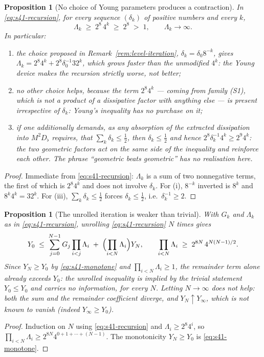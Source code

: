 \documentclass[11pt]{article}
\newtheorem{proposition}[theorem]{Proposition}
\theoremstyle{definition}
\theoremstyle{remark}
\begin{document}
\begin{proposition}[No choice of Young parameters produces a contraction]
  \label{prop:s41-nocontraction}
  In \eqref{eq:s41-recursion}, for every sequence $(\delta_k)$ of positive
  numbers and every $k$,
  \[
    \Lambda_k \;\geq\; 2^{8}\,4^{k} \;\geq\; 2^{8}\;>\;1,
    \qquad \Lambda_k\to\infty .
  \]
  In particular:
  \begin{enumerate}[label=(\roman*)]
    \item the choice proposed in Remark~\ref{rem:level-iteration},
      $\delta_k=\delta_0 8^{-k}$, gives
      $\Lambda_k=2^{8}4^{k}+2^{8}\delta_0^{-1}32^{k}$, which grows
      \emph{faster} than the unmodified $4^{k}$: the Young device makes the
      recursion strictly worse, not better;
    \item no other choice helps, because the term $2^{8}4^{k}$ --- coming
      from family (S1), which is not a product of a dissipative factor with
      anything else --- is present irrespective of $\delta_k$: Young's
      inequality has no purchase on it;
    \item if one additionally demands, as any absorption of the extracted
      dissipation into $M^2D_\flat$ requires, that $\sum_k\delta_k\leq\tfrac12$,
      then $\delta_k\leq\tfrac12$ and hence
      $2^{8}\delta_k^{-1}4^{k}\geq2^{9}4^{k}$: the two geometric factors act
      on the \emph{same} side of the inequality and reinforce each other.
      The phrase ``geometric beats geometric'' has no realisation here.
  \end{enumerate}
\end{proposition}
\begin{proof}
  Immediate from \eqref{eq:s41-recursion}: $\Lambda_k$ is a sum of two
  nonnegative terms, the first of which is $2^{8}4^{k}$ and does not involve
  $\delta_k$. For (i), $8^{-k}$ inverted is $8^{k}$ and
  $8^{k}4^{k}=32^{k}$. For (iii), $\sum_k\delta_k\leq\tfrac12$ forces
  $\delta_k\leq\tfrac12$, i.e.\ $\delta_k^{-1}\geq2$.
\end{proof}

\begin{proposition}[The unrolled iteration is weaker than trivial]
  \label{prop:s41-vacuous}
  With $G_k$ and $\Lambda_k$ as in \eqref{eq:s41-recursion}, unrolling
  \eqref{eq:s41-recursion} $N$ times gives
  \[
    Y_0 \;\leq\; \sum_{j=0}^{N-1}G_j\prod_{i<j}\Lambda_i
      \;+\;\Bigl(\prod_{i<N}\Lambda_i\Bigr)Y_N,
    \qquad
    \prod_{i<N}\Lambda_i \;\geq\; 2^{8N}\,4^{N(N-1)/2}.
  \]
  Since $Y_N\geq Y_0$ by \eqref{eq:s41-monotone} and
  $\prod_{i<N}\Lambda_i\geq1$, the remainder term alone already exceeds
  $Y_0$: the unrolled inequality is implied by the trivial statement
  $Y_0\leq Y_0$ and carries no information, for every $N$. Letting
  $N\to\infty$ does not help: both the sum and the remainder coefficient
  diverge, and $Y_N\uparrow Y_\infty$, which is not known to vanish (indeed
  $Y_\infty\geq Y_0$).
\end{proposition}
\begin{proof}
  Induction on $N$ using \eqref{eq:s41-recursion} and
  $\Lambda_i\geq2^{8}4^{i}$, so
  $\prod_{i<N}\Lambda_i\geq2^{8N}4^{0+1+\cdots+(N-1)}$. The monotonicity
  $Y_N\geq Y_0$ is \eqref{eq:s41-monotone}.
\end{proof}
\end{document}
